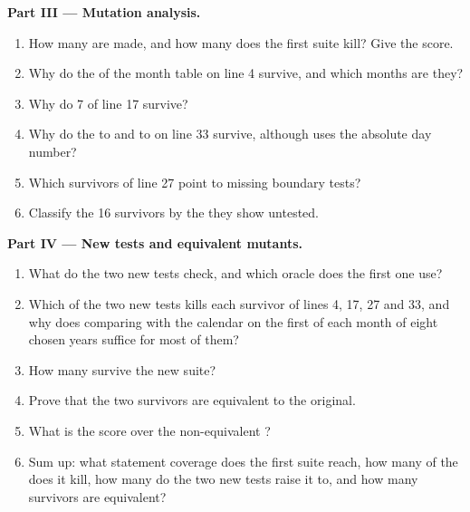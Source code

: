 \begin{problem}
\medskip\noindent\textbf{Part III --- Mutation analysis.}
\begin{enumerate}[resume]
  \item How many  are made, and how many does the first suite kill? Give the score.
  \item Why do the  of the month table on line 4 survive, and which months are they?
  \item Why do 7  of line 17 survive?
  \item Why do the   to  and  to  on line 33 survive, although  uses the absolute day number?
  \item Which survivors of line 27 point to missing boundary tests?
  \item Classify the 16 survivors by the  they show untested.
\end{enumerate}

\medskip\noindent\textbf{Part IV --- New tests and equivalent mutants.}
\begin{enumerate}[resume]
  \item What do the two new tests check, and which oracle does the first one use?
  \item Which of the two new tests kills each survivor of lines 4, 17, 27 and 33, and why does comparing  with the calendar on the first of each month of eight chosen years suffice for most of them?
  \item How many  survive the new suite?
  \item Prove that the two survivors are equivalent to the original.
  \item What is the score over the non-equivalent ?
  \item Sum up: what statement coverage does the first suite reach, how many of the  does it kill, how many do the two new tests raise it to, and how many survivors are equivalent?
\end{enumerate}
\end{problem}
